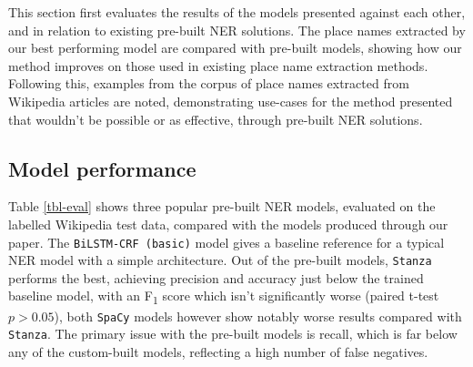 \documentclass[
  letterpaper,
  11pt,
  english,
  onehalfspacing,
  headsepline]{MastersDoctoralThesis}
\begin{document}
This section first evaluates the results of the models presented against
each other, and in relation to existing pre-built NER solutions. The
place names extracted by our best performing model are compared with
pre-built models, showing how our method improves on those used in
existing place name extraction methods. Following this, examples from
the corpus of place names extracted from Wikipedia articles are noted,
demonstrating use-cases for the method presented that wouldn't be
possible or as effective, through pre-built NER solutions.

\hypertarget{model-performance}{%
\subsection{Model performance}\label{model-performance}}

Table \ref{tbl-eval} shows three popular pre-built NER models, evaluated
on the labelled Wikipedia test data, compared with the models produced
through our paper. The \texttt{BiLSTM-CRF\ (basic)} model gives a
baseline reference for a typical NER model with a simple architecture.
Out of the pre-built models, \texttt{Stanza} performs the best,
achieving precision and accuracy just below the trained baseline model,
with an F\textsubscript{1} score which isn't significantly worse (paired
t-test \(p>0.05\)), both \texttt{SpaCy} models however show notably
worse results compared with \texttt{Stanza}. The primary issue with the
pre-built models is recall, which is far below any of the custom-built
models, reflecting a high number of false negatives.
\end{document}
